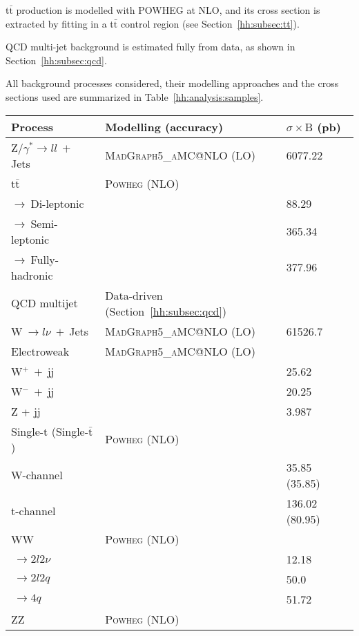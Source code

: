 \documentclass[../main.tex]{subfiles}
\begin{document}
t$\bar{\text{t}}$ production is modelled with \textsc{POWHEG} at NLO, and its cross section is extracted by fitting in a t$\bar{\text{t}}$ control region (see Section~\ref{hh:subsec:tt}).

QCD multi-jet background is estimated fully from data, as shown in Section~\ref{hh:subsec:qcd}.

All background processes considered, their modelling approaches and the cross sections used are summarized in Table~\ref{hh:analysis:samples}.


\begin{table}[p]
\begin{footnotesize}
\begin{center}

	\begin{tabular}{l | l | l}
		\hline\hline
		Process & Modelling (accuracy) & $\sigma\times\mathrm{B}$ (pb) \\\hline\hline
		Z/$\gamma^*\to ll~+~$Jets & \textsc{MadGraph5\_aMC@NLO} (LO) & 6077.22 \\\hline
		$\text{t}\bar{\text{t}}$ & \textsc{Powheg} (NLO) & \\
		\quad $\to~$Di-leptonic & & 88.29 \\
		\quad $\to~$Semi-leptonic & & 365.34 \\
		\quad $\to~$Fully-hadronic & & 377.96 \\
\hline
	 	QCD multijet & Data-driven (Section~\ref{hh:subsec:qcd}) & \\
\hline
		W$~\to l\nu~+~$Jets &  \textsc{MadGraph5\_aMC@NLO} (LO) & 61526.7\\
\hline
		Electroweak & \textsc{MadGraph5\_aMC@NLO} (LO) & \\
		W${}^+~+~$jj & & 25.62 \\
		W${}^-~+~$jj & & 20.25 \\
		Z + jj & & 3.987 \\
\hline
		Single-t (Single-$\bar{\text{t}}$) & \textsc{Powheg} (NLO) & \\
		W-channel & & 35.85 (35.85) \\
		t-channel & & 136.02 (80.95) \\
\hline
		WW & \textsc{Powheg} (NLO) & \\
		\quad$~\to 2l2\nu$ & & 12.18 \\
		\quad$~\to 2l2q$ & & 50.0 \\
		\quad$~\to 4q$ & & 51.72 \\
\hline
		ZZ & \textsc{Powheg} (NLO) & \\

\end{tabular}
\end{center}
\end{footnotesize}
\end{table}
\end{document}
